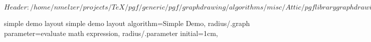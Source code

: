 %
%
%

\ProvidesFileRCS[v\pgfversion] $Header: /home/nmelzer/projects/TeX/pgf/generic/pgf/graphdrawing/algorithms/misc/Attic/pgflibrarygraphdrawing.misc.code.tex,v 1.7 2012/04/05 11:48:25 tantau Exp $



%
%
\pgfgddeclarealgorithmkey
  {simple demo layout}
  {simple demo layout}
  {
    algorithm=Simple Demo,
    radius/.graph parameter=evaluate math expression,
    radius/.parameter initial=1cm,
  }



\endinput